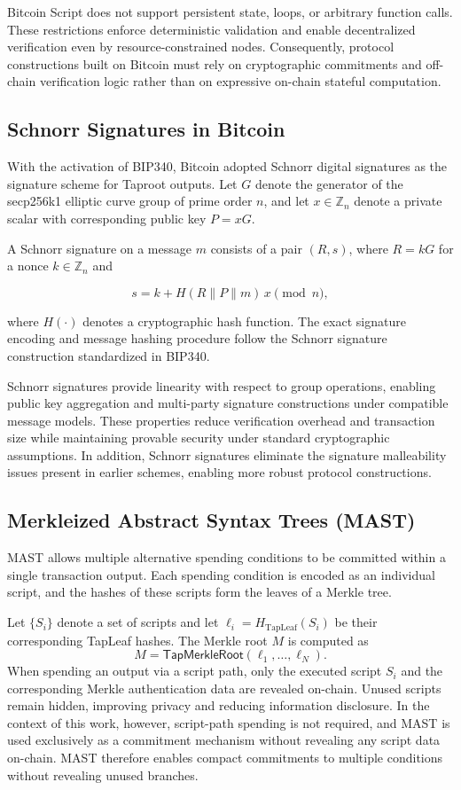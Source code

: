 \documentclass{IEEEoj}
\begin{document}
Bitcoin Script does not support persistent state, loops, or arbitrary function calls. These restrictions enforce deterministic validation and enable decentralized verification even by resource-constrained nodes. Consequently, protocol constructions built on Bitcoin must rely on cryptographic commitments and off-chain verification logic rather than on expressive on-chain stateful computation.

\subsection{Schnorr Signatures in Bitcoin}

With the activation of BIP340, Bitcoin adopted Schnorr digital signatures as the signature scheme for Taproot outputs.
Let $G$ denote the generator of the secp256k1 elliptic curve group of prime order $n$, and let $x \in \mathbb{Z}_n$ denote a private scalar with corresponding public key $P = xG$.

A Schnorr signature on a message $m$ consists of a pair $(R, s)$, where $R = kG$ for a nonce $k \in \mathbb{Z}_n$ and

\[
s = k + H(R \parallel P \parallel m)\,x \pmod{n},
\]

where $H(\cdot)$ denotes a cryptographic hash function.
The exact signature encoding and message hashing procedure follow the Schnorr signature construction standardized in BIP340.

Schnorr signatures provide linearity with respect to group operations, enabling public key aggregation and multi-party signature constructions under compatible message models.
These properties reduce verification overhead and transaction size while maintaining provable security under standard cryptographic assumptions.
In addition, Schnorr signatures eliminate the signature malleability issues present in earlier schemes, enabling more robust protocol constructions.

\subsection{Merkleized Abstract Syntax Trees (MAST)}

MAST allows multiple alternative spending conditions to be committed within a single transaction output.
Each spending condition is encoded as an individual script, and the hashes of these scripts form the leaves of a Merkle tree.

Let $\{S_i\}$ denote a set of scripts and let $\ell_i = H_{\text{TapLeaf}}(S_i)$ be their corresponding TapLeaf hashes.
The Merkle root $M$ is computed as
\[
M = \textsf{TapMerkleRoot}(\ell_1, \ldots, \ell_N).
\]
When spending an output via a script path, only the executed script $S_i$ and the corresponding Merkle authentication data are revealed on-chain.
Unused scripts remain hidden, improving privacy and reducing information disclosure. In the context of this work, however, script-path spending is not required, and MAST is used exclusively as a commitment mechanism without revealing any script data on-chain.
MAST therefore enables compact commitments to multiple conditions without revealing unused branches.
\end{document}
